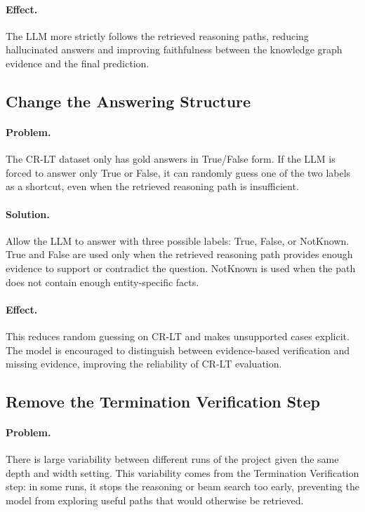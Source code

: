 \documentclass[11pt]{article}
\begin{document}
\paragraph{Effect.}
The LLM more strictly follows the retrieved reasoning paths, reducing hallucinated answers and improving faithfulness between the knowledge graph evidence and the final prediction.

\subsection{Change the Answering Structure}

\paragraph{Problem.}
The CR-LT dataset only has gold answers in True/False form. If the LLM is forced to answer only True or False, it can randomly guess one of the two labels as a shortcut, even when the retrieved reasoning path is insufficient.

\paragraph{Solution.}
Allow the LLM to answer with three possible labels: True, False, or NotKnown. True and False are used only when the retrieved reasoning path provides enough evidence to support or contradict the question. NotKnown is used when the path does not contain enough entity-specific facts.

\paragraph{Effect.}
This reduces random guessing on CR-LT and makes unsupported cases explicit. The model is encouraged to distinguish between evidence-based verification and missing evidence, improving the reliability of CR-LT evaluation.

\subsection{Remove the Termination Verification Step}

\paragraph{Problem.}
There is large variability between different runs of the project given the same depth and width setting. This variability comes from the Termination Verification step: in some runs, it stops the reasoning or beam search too early, preventing the model from exploring useful paths that would otherwise be retrieved.
\end{document}

